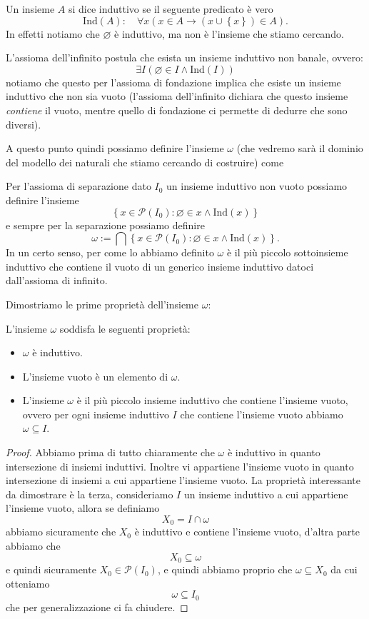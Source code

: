 \documentclass[11pt]{scrartcl}
\newcommand{\eset}{\varnothing}
\newcommand{\parti}[1]{\mathcal{P}\!\left(#1\right)}
\begin{document}
	\begin{definition}
		Un insieme $A$ si dice induttivo se il seguente predicato è vero
		$$\text{Ind}(A): \quad \forall x\left(x\in A \to \left(x\cup \left\{x\right\}\right)\in A\right).$$
		In effetti notiamo che $\eset$ è induttivo, ma non è l'insieme che stiamo cercando.
	\end{definition}
	\begin{definition}
		L'assioma dell'infinito postula che esista un insieme induttivo non banale, ovvero:
		$$\exists I\left(\eset \in I \land \text{Ind}(I)\right)$$
		notiamo che questo per l'assioma di fondazione implica che esiste un insieme induttivo che non sia vuoto (l'assioma dell'infinito dichiara che questo insieme \textit{contiene} il vuoto, mentre quello di fondazione ci permette di dedurre che sono diversi).
	\end{definition}
	A questo punto quindi possiamo definire l'insieme $\omega$ (che vedremo sarà il dominio del modello dei naturali che stiamo cercando di costruire) come
	\begin{definition}
		Per l'assioma di separazione dato $I_0$ un insieme induttivo non vuoto possiamo definire l'insieme
		$$\left\{x\in \parti{I_0}:\eset\in x\land \text{Ind}(x)\right\}$$
		e sempre per la separazione possiamo definire
		$$\omega:=\bigcap \left\{x\in \parti{I_0}:\eset\in x\land \text{Ind}(x)\right\}.$$
		In un certo senso, per come lo abbiamo definito $\omega$ è il più piccolo sottoinsieme induttivo che contiene il vuoto di un generico insieme induttivo datoci dall'assioma di infinito.
	\end{definition}
	Dimostriamo le prime proprietà dell'insieme $\omega$:
	\begin{proposition}
		L'insieme $\omega$ soddisfa le seguenti proprietà:
		\begin{itemize}
			\item $\omega$ è induttivo.
			\item L'insieme vuoto è un elemento di $\omega$.
			\item 
			L'insieme $\omega$ è il più piccolo insieme induttivo che contiene l'insieme vuoto, ovvero per ogni insieme induttivo $I$ che contiene l'insieme vuoto abbiamo $\omega\subseteq I$.
		\end{itemize}
	\end{proposition}
	\begin{proof}
		Abbiamo prima di tutto chiaramente che $\omega$ è induttivo in quanto intersezione di insiemi induttivi. Inoltre vi appartiene l'insieme vuoto in quanto intersezione di insiemi a cui appartiene l'insieme vuoto. La proprietà interessante da dimostrare è la terza, consideriamo $I$ un insieme induttivo a cui appartiene l'insieme vuoto, allora se definiamo 
		$$X_0=I\cap \omega$$
		abbiamo sicuramente che $X_0$ è induttivo e contiene l'insieme vuoto, d'altra parte abbiamo che 
		$$X_0\subseteq \omega$$
		e quindi sicuramente $X_0\in \parti{I_0}$, e quindi abbiamo proprio che $\omega\subseteq X_0$ da cui otteniamo 
		$$\omega \subseteq I_0$$
		che per generalizzazione ci fa chiudere.
 	\end{proof}
\end{document}
